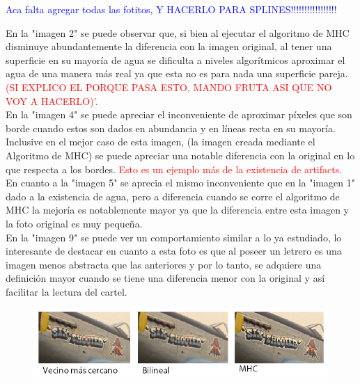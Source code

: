 \documentclass[a4paper]{article}
\begin{document}
\textcolor{blue}{Aca falta agregar todas las fotitos, Y HACERLO PARA SPLINES!!!!!!!!!!!!!!!!!}


En la "imagen 2"  se puede observar que, si bien al ejecutar el algoritmo de MHC disminuye abundantemente la diferencia con la imagen original, al tener una superficie en su mayor\'ia de agua se dificulta a niveles algor\'itmicos aproximar el agua de una manera m\'as real ya que esta no es para nada una superficie pareja. \textcolor{red}{(SI EXPLICO EL PORQUE PASA ESTO, MANDO FRUTA ASI QUE NO VOY A HACERLO)'.}\\

En la "imagen 4" se puede apreciar el inconveniente de aproximar p\'ixeles que son borde cuando estos son dados en abundancia y en l\'ineas recta en su mayor\'ia. Inclusive en el mejor caso de esta imagen, (la imagen creada mediante el Algoritmo de MHC) se puede apreciar una notable diferencia con la original en lo que respecta a los bordes. \textcolor{red}{Esto es un ejemplo m\'as de la existencia de artifacts.}\\

En cuanto a la "imagen 5" se aprecia el mismo inconveniente que en la "imagen 1" dado a la existencia de agua, pero a diferencia cuando se corre el algoritmo de MHC la mejor\'ia es notablemente mayor ya que la diferencia entre esta imagen y la foto original es muy peque\~na.\\

En la "imagen 9" se puede ver un comportamiento similar a lo ya estudiado, lo interesante de destacar en cuanto a esta foto es que al poseer un letrero es una imagen menos abstracta que las anteriores y por lo tanto, se adquiere una definici\'on mayor cuando se tiene una diferencia menor con la original y as\'i facilitar la lectura del cartel.


\begin{figure}[h!]
	\caption{}
	\begin{center}
	\includegraphics[scale=0.05]{imagenes/comparacion/cartel}
	\label{cartel}
  \end{center}
\end{figure}
\end{document}
